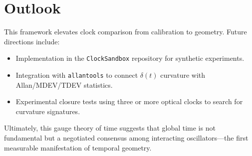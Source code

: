 \documentclass[11pt,a4paper]{article}
\begin{document}
\section{Outlook}
This framework elevates clock comparison from calibration to geometry. 
Future directions include:
\begin{itemize}
\item Implementation in the \texttt{ClockSandbox} repository for synthetic experiments.
\item Integration with \texttt{allantools} to connect $\delta(t)$ curvature with Allan/MDEV/TDEV statistics.
\item Experimental closure tests using three or more optical clocks to search for curvature signatures.
\end{itemize}
Ultimately, this gauge theory of time suggests that global time is not fundamental but a negotiated consensus among interacting oscillators—the first measurable manifestation of temporal geometry.
\end{document}
